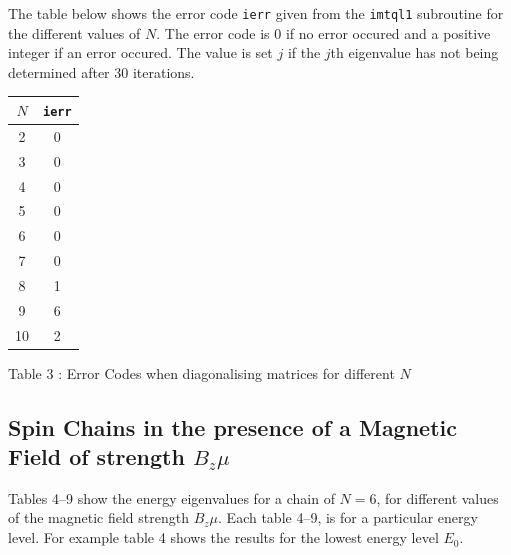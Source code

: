 \documentclass[a4paper]{IEEEtran}
\begin{document}
    The table below shows the error code \texttt{ierr} given from the 
    \texttt{imtql1} subroutine for the different values of $N$. The error code
    is 0 if no error occured and a positive integer if an error occured. The value
    is set $j$ if the $j$th eigenvalue has not being determined after 30 iterations.

    \begin{table} 
    \begin{center}
        \begin{tabular}{|c|c|} \hline
        $N$ & \texttt{ierr} \\ \hline \hline
        2 & 0 \\ \hline
        3 & 0 \\ \hline
        4 & 0 \\ \hline
        5 & 0 \\ \hline
        6 & 0 \\ \hline
        7 & 0 \\ \hline
        8 & 1 \\ \hline
        9 & 6 \\ \hline
       10 & 2 \\ \hline
        \end{tabular}
        \vspace{1mm}
        \begin{center}
            Table 3 : Error Codes when diagonalising matrices for different $N$
        \end{center}
    \end{center}
    \end{table} 
  
    \subsection*{Spin Chains in the presence of a Magnetic Field of strength $B_z\mu$}
    Tables 4--9 show the energy eigenvalues for a chain of $N=6$, for different 
    values of the magnetic field strength $B_z\mu$. Each table 4--9, is for 
    a particular energy level. For example table 4 shows the results for the
    lowest energy level $E_0$.
\end{document}
